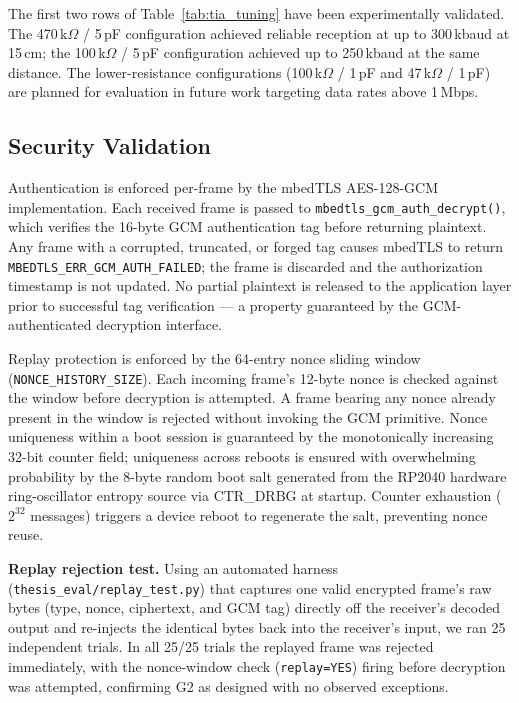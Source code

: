 \documentclass[conference]{IEEEtran}
\begin{document}
The first two rows of Table~\ref{tab:tia_tuning} have been experimentally validated. The 470\,k$\Omega$ / 5\,pF configuration achieved reliable reception at up to 300\,kbaud at 15\,cm; the 100\,k$\Omega$ / 5\,pF configuration achieved up to 250\,kbaud at the same distance. The lower-resistance configurations (100\,k$\Omega$ / 1\,pF and 47\,k$\Omega$ / 1\,pF) are planned for evaluation in future work targeting data rates above 1\,Mbps.

\subsection{Security Validation}
\label{sec:security-validation}

Authentication is enforced per-frame by the mbedTLS AES-128-GCM implementation. Each received frame is passed to \texttt{mbedtls\_gcm\_auth\_decrypt()}, which verifies the 16-byte GCM authentication tag before returning plaintext. Any frame with a corrupted, truncated, or forged tag causes mbedTLS to return \texttt{MBEDTLS\_ERR\_GCM\_AUTH\_FAILED}; the frame is discarded and the authorization timestamp is not updated. No partial plaintext is released to the application layer prior to successful tag verification — a property guaranteed by the GCM-authenticated decryption interface.

Replay protection is enforced by the 64-entry nonce sliding window (\texttt{NONCE\_HISTORY\_SIZE}). Each incoming frame's 12-byte nonce is checked against the window before decryption is attempted. A frame bearing any nonce already present in the window is rejected without invoking the GCM primitive. Nonce uniqueness within a boot session is guaranteed by the monotonically increasing 32-bit counter field; uniqueness across reboots is ensured with overwhelming probability by the 8-byte random boot salt generated from the RP2040 hardware ring-oscillator entropy source via CTR\_DRBG at startup. Counter exhaustion ($2^{32}$ messages) triggers a device reboot to regenerate the salt, preventing nonce reuse.

\textbf{Replay rejection test.} Using an automated harness (\texttt{thesis\_eval/replay\_test.py}) that captures one valid encrypted frame's raw bytes (type, nonce, ciphertext, and GCM tag) directly off the receiver's decoded output and re-injects the identical bytes back into the receiver's input, we ran 25 independent trials. In all 25/25 trials the replayed frame was rejected immediately, with the nonce-window check (\texttt{replay=YES}) firing before decryption was attempted, confirming G2 as designed with no observed exceptions.
\end{document}

